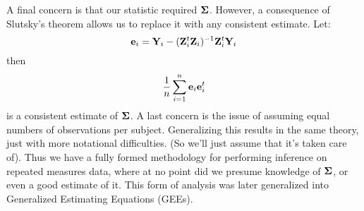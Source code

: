 A final concern is that our statistic required $\boldsymbol{\Sigma}$. However, a consequence of 
Slutsky's theorem allows
us to replace it with any consistent estimate. Let:
$$
\mathbf{e}_i = \mathbf{Y}_i - (\mathbf{Z}_i^t \mathbf{Z}_i)^{-1} \mathbf{Z}_i^t \mathbf{Y}_i 
$$
then 
$$
\frac{1}{n} \sum_{i=1}^n \mathbf{e}_i \mathbf{e}_i^t
$$
is a consistent estimate of $\boldsymbol{\Sigma}$. A last concern is the issue of assuming equal
numbers of observations per subject. Generalizing this results in the same theory, just with more
notational difficulties. (So we'll just assume that it's taken care of). 
Thus we have a fully formed methodology for
performing inference on repeated measures data, where at no point did we presume
knowledge of $\boldsymbol{\Sigma}$, or even a good estimate of it. This form of analysis 
was later generalized into Generalized Estimating Equations (GEEs). 





